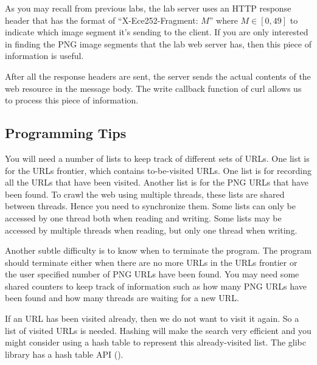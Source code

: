 As you may recall from previous labs, the lab server uses an HTTP response header that has the format of ``X-Ece252-Fragment: $M$'' where $M \in [0, 49]$ to indicate which image segment it's sending to the client. If you are only interested in finding the PNG image segments that the lab web server has, then this piece of information is useful.

After all the response headers are sent, the server sends the actual contents of the web resource in the message body. The write callback function of curl allows us to process this piece of information. 
\subsection{Programming Tips}
You will need a number of lists to keep track of different sets of URLs. One list is for the URLs frontier, which contains to-be-visited URLs. One list is for recording all the URLs that have been visited. Another list is for the PNG URLs that have been found. To crawl the web using multiple threads, these lists are shared between threads. Hence you need to synchronize them. Some lists can only be accessed by one thread both when reading and writing. Some lists may be accessed by multiple threads when reading, but only one thread when writing.

Another subtle difficulty is to know when to terminate the program. The program should terminate either when there are no more URLs in the URLs frontier or the user specified number of PNG URLs have been found. You may need some shared counters to keep track of information such as how many PNG URLs have been found and how many threads are waiting for a new URL.

If an URL has been visited already, then we do not want to visit it again. So a list of visited URLs is needed. Hashing will make the search very efficient and you might consider using a hash table to represent this already-visited list. The glibc library has a hash table API ().

